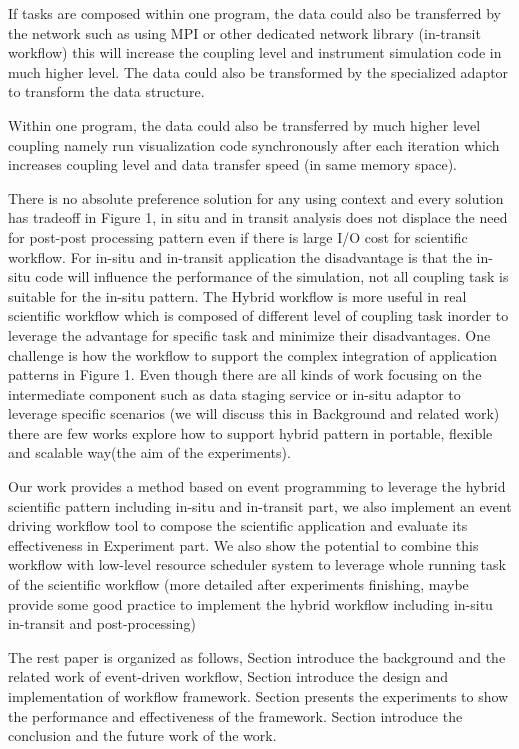 If tasks are composed within one program, the data could also be transferred by the network such as using MPI or other dedicated network library (in-transit workflow) this will increase the coupling level and instrument simulation code in much higher level. The data could also be transformed by the specialized adaptor to transform the data structure.

Within one program, the data could also be transferred by much higher level coupling namely run visualization code synchronously after each iteration which increases coupling level and data transfer speed (in same memory space).

There is no absolute preference  solution for any using context and every solution has tradeoff in Figure 1, in situ and in transit analysis does not displace the need for post-post processing pattern even if there is large I/O cost for scientific workflow\cite{bauer2016situ}.  For in-situ  and in-transit application the disadvantage is that the in-situ code will influence the performance of the simulation, not all coupling task is suitable for the in-situ pattern. The Hybrid workflow is more useful in real scientific workflow which is composed of different level of coupling task inorder to leverage the advantage for specific task and minimize their disadvantages. One challenge is how the workflow to support the complex integration of application patterns in Figure 1. Even though there are all kinds of work focusing on the intermediate component such as data staging service or in-situ adaptor to leverage specific scenarios (we will discuss this in Background and related work) there are few works explore how to support hybrid pattern in portable, flexible and scalable way(the aim of the experiments).

Our work provides a method based on event programming to leverage the hybrid scientific pattern including in-situ and in-transit part, we also implement an event driving workflow tool to compose the scientific application and evaluate its effectiveness in Experiment part. We also show the potential to combine this workflow with low-level resource scheduler system to leverage whole running task of the scientific workflow (more detailed after experiments finishing, maybe provide some good practice to implement the hybrid workflow including in-situ in-transit and post-processing)

The rest paper is organized as follows, Section \uppercase\expandafter{} introduce the background and the related work of event-driven workflow, Section \uppercase\expandafter{} introduce the design and implementation of workflow framework. Section \uppercase\expandafter{} presents the experiments to show the performance and effectiveness of the framework. Section \uppercase\expandafter{} introduce the conclusion and the future work of the work.

